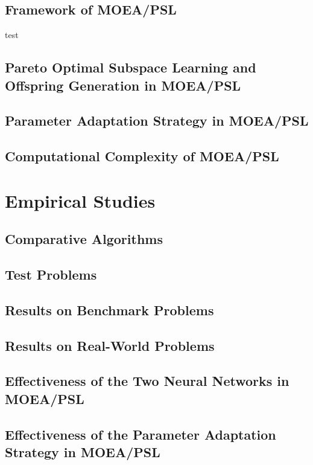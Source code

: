\documentclass[journal]{IEEEtran}
\begin{document}
\subsection{Framework of MOEA/PSL}
test
\subsection{Pareto Optimal Subspace Learning and Offspring Generation in MOEA/PSL}

\subsection{Parameter Adaptation Strategy in MOEA/PSL}

\subsection{Computational Complexity of MOEA/PSL}


\section{Empirical Studies}


\subsection{Comparative Algorithms}

\subsection{Test Problems}

\subsection{Results on Benchmark Problems}

\subsection{Results on Real-World Problems}

\subsection{Effectiveness of the Two Neural Networks in MOEA/PSL}\label{sec:twoNNs}

\subsection{Effectiveness of the Parameter Adaptation Strategy in MOEA/PSL}
\end{document}
